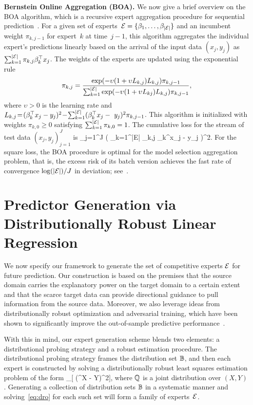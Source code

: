 \documentclass{article}
\begin{document}
\textbf{Bernstein Online Aggregation (BOA). } We now give a brief overview on the BOA algorithm, which is a recursive expert aggregation procedure for sequential prediction~\citep{ref:cesa2006prediction}. For a given set of experts~$\mathcal E = \{\beta_{1}, \ldots, \beta_{|\mathcal E|}\}$ and an incumbent weight $\pi_{k, j-1}$ for expert~$k$ at time~$j-1$, this algorithm aggregates the individual expert's predictions linearly based on the arrival of the input data $(x_j, y_j)$ as $\sum_{k=1}^{|\mathcal E|} \pi_{k,j} \beta_k^\top x_j$. The weights of the experts are updated using the exponential rule
      \[\pi_{k ,j} = \frac{\exp(-\upsilon(1+\upsilon L_{k,j}) L_{k ,j})\pi_{k, j-1}}{\sum_{k=1}^{|\mathcal E|} \exp(-\upsilon(1+\upsilon L_{kj}) L_{k ,j})\pi_{k, j-1}},\]
where $\upsilon>0$ is the learning rate and $L_{k,j} \!=\! (\beta_k^\top x_j - y_j)^2 \!-\! \sum_{k=1}^{|\mathcal E|} (\beta_k^\top x_j -\ y_j)^2 \pi_{k, j-1}$. This algorithm is initialized with weights $\pi_{k,0} \geq 0$ satisfying $\sum_{k=1}^{|\mathcal E|}\pi_{k, 0} = 1$. The cumulative loss for the stream of test data $(x_j, y_j)_{j=1}^J$ is
\be \label{eq:cumulative-loss}
    \sum_{j=1}^J \left( \sum_{k=1}^{|\mc E|} \pi_{k,j} \beta_k^\top x_j - y_j \right)^2.
\ee
For the square loss, the BOA procedure is optimal for the model selection aggregation problem, that is, the excess risk of its batch version achieves the fast rate of convergence $\log(|\mathcal E|)/J$ in deviation; see~\citet{ref:wintenberger2017optimal}.

\section{Predictor Generation via Distributionally Robust Linear Regression} 
\label{sect:DRLR}

We now specify our framework to generate the set of competitive experts $\mathcal E$ for future prediction. Our construction is based on the premises that the source domain carries the explanatory power on the target domain to a certain extent and that the scarce target data can provide directional guidance to pull information from the source data. Moreover, we also leverage ideas from distributionally robust optimization and adversarial training, which have been shown to significantly improve the out-of-sample predictive performance~\cite{ref:duchi2018learning,ref:esfahani2018data, ref:blanchet2019robust, ref:gao2020finite, ref:lam2019recovering}. 

With this in mind, our expert generation scheme blends two elements: a distributional probing strategy and a robust estimation procedure. The distributional probing strategy frames the distribution set $\mathbb B$, and then each expert is constructed by solving a distributionally robust least squares estimation problem of the form
\be \label{eq:dro}
	  \EE_{\QQ}[ (\beta^\top X - Y)^2],
\ee
where $\mathbb Q$ is a joint distribution over $(X, Y)$. Generating a collection of distribution sets $\mathbb B$ in a systematic manner and solving~\eqref{eq:dro} for each such set will form a family of experts~$\mathcal E$. 
\end{document}
